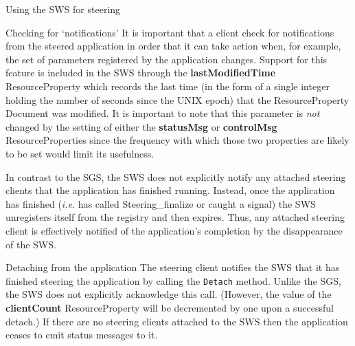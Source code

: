 \documentclass[a4paper]{article}
\begin{document}
\begin{section}{Using the SWS for steering}
\begin{subsection}{Checking for `notifications'}
\label{sec:notification}
It is important that a client check for notifications from the steered
application in order that it can take action when, for example, the
set of parameters registered by the application changes.  Support for
this feature is included in the SWS through the {\bf lastModifiedTime}
ResourceProperty which records the last time (in the form of a single
integer holding the number of seconds since the UNIX epoch) that the
ResourceProperty Document was modified.  It is important to note that
this parameter is {\em not} changed by the setting of either the {\bf
statusMsg} or {\bf controlMsg} ResourceProperties since the frequency
with which those two properties are likely to be set would limit its
usefulness.

In contrast to the SGS, the SWS does not explicitly notify any
attached steering clients that the application has finished running.
Instead, once the application has finished ({\it i.e.} has called
Steering\_finalize or caught a signal) the SWS unregisters itself from
the registry and then expires.  Thus, any attached steering client is
effectively notified of the application's completion by the
disappearance of the SWS.
\end{subsection}

\begin{subsection}{Detaching from the application}
The steering client notifies the SWS that it has finished steering the
application by calling the \texttt{Detach} method.  Unlike the SGS, the
SWS does not explicitly acknowledge this call.  (However, the value of
the {\bf clientCount} ResourceProperty will be decremented by one upon
a successful detach.)  If there are no steering clients attached to
the SWS then the application ceases to emit status messages to it.
\end{subsection}

\end{section}

\end{document}
